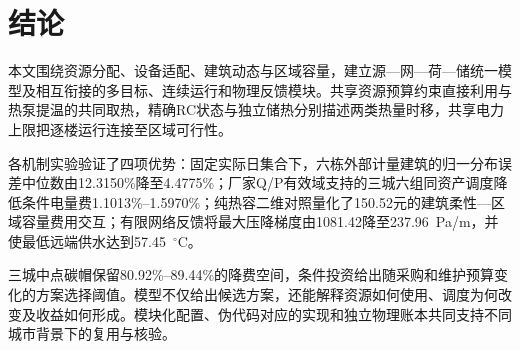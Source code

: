 \section{结论}

本文围绕资源分配、设备适配、建筑动态与区域容量，建立源—网—荷—储统一模型及相互衔接的多目标、连续运行和物理反馈模块。共享资源预算约束直接利用与热泵提温的共同取热，精确RC状态与独立储热分别描述两类热量时移，共享电力上限把逐楼运行连接至区域可行性。

各机制实验验证了四项优势：固定实际日集合下，六栋外部计量建筑的归一分布误差中位数由12.3150\%降至4.4775\%；厂家Q/P有效域支持的三城六组同资产调度降低条件电量费1.1013\%--1.5970\%；纯热容二维对照量化了150.52元的建筑柔性—区域容量费用交互；有限网络反馈将最大压降梯度由1081.42降至237.96~Pa/m，并使最低远端供水达到57.45~$^\circ$C。

三城中点碳帽保留80.92\%--89.44\%的降费空间，条件投资给出随采购和维护预算变化的方案选择阈值。模型不仅给出候选方案，还能解释资源如何使用、调度为何改变及收益如何形成。模块化配置、伪代码对应的实现和独立物理账本共同支持不同城市背景下的复用与核验。
